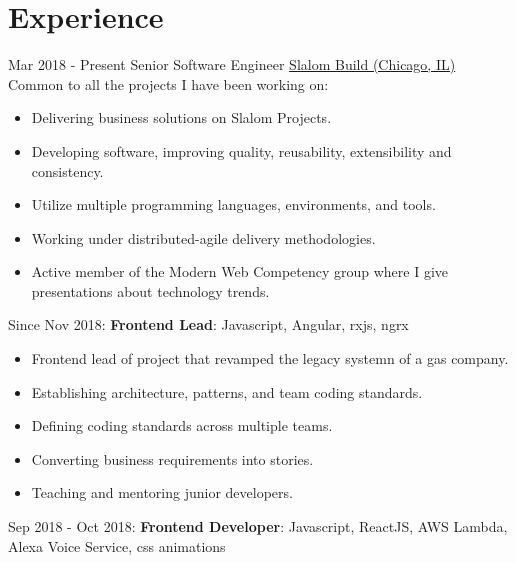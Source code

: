 \documentclass[letterpaper]{template} %
\begin{document}
\makeprofile %


\section{Experience}

\begin{twenty} %
    \twentyitem
    	{Mar 2018 - Present}
		{}
        {Senior Software Engineer}
        {\href{https://www.slalom.com/}{Slalom Build (Chicago, IL)}}
        {Common to all the projects I have been working on:}
        {\begin{itemize}
            \item Delivering business solutions on Slalom Projects.
            \item Developing software, improving quality, reusability, extensibility and consistency.
            \item Utilize multiple programming languages, environments, and tools.
            \item Working under distributed-agile delivery methodologies.
            \item Active member of the Modern Web Competency group where I give presentations about technology trends.
        \end{itemize}}
    \twentyitem
        {}
        {}
        {}
        {}
        {Since Nov 2018: \textbf{Frontend Lead}: Javascript, Angular, rxjs, ngrx}
        {\begin{itemize}
            \item Frontend lead of project that revamped the legacy systemn of a gas company.
            \item Establishing architecture, patterns, and team coding standards.
            \item Defining coding standards across multiple teams.
            \item Converting business requirements into stories.
            \item Teaching and mentoring junior developers.
        \end{itemize}}
    \twentyitem
    	{}
		{}
        {}
        {}
        {Sep 2018 - Oct 2018: \textbf{Frontend Developer}: Javascript, ReactJS, AWS Lambda, Alexa Voice Service, css animations}

\end{twenty}
\end{document}
